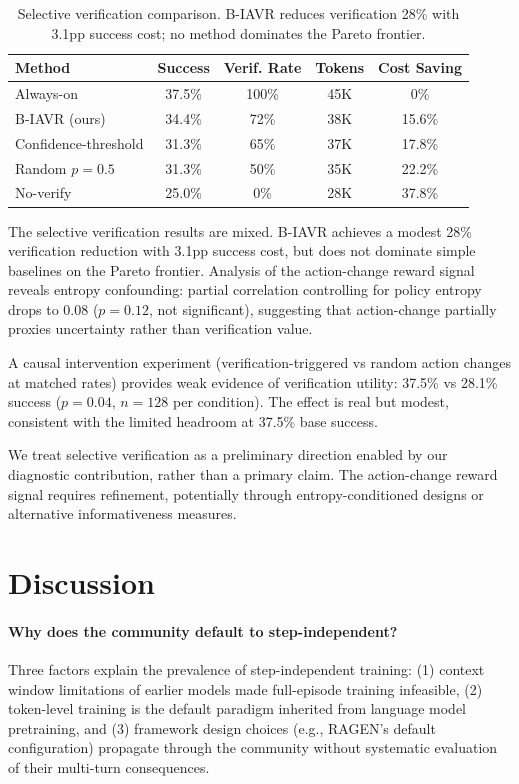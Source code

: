 \documentclass[11pt]{article}
\begin{document}
\begin{table}[h]
\centering
\caption{Selective verification comparison. B-IAVR reduces verification 28\% with 3.1pp success cost; no method dominates the Pareto frontier.}
\label{tab:selective}
\begin{tabular}{lcccc}
\toprule
Method & Success & Verif. Rate & Tokens & Cost Saving \\
\midrule
Always-on & 37.5\% & 100\% & 45K & 0\% \\
B-IAVR (ours) & 34.4\% & 72\% & 38K & 15.6\% \\
Confidence-threshold & 31.3\% & 65\% & 37K & 17.8\% \\
Random $p=0.5$ & 31.3\% & 50\% & 35K & 22.2\% \\
No-verify & 25.0\% & 0\% & 28K & 37.8\% \\
\bottomrule
\end{tabular}
\end{table}

The selective verification results are mixed. B-IAVR achieves a modest 28\% verification reduction with 3.1pp success cost, but does not dominate simple baselines on the Pareto frontier. Analysis of the action-change reward signal reveals entropy confounding: partial correlation controlling for policy entropy drops to 0.08 ($p=0.12$, not significant), suggesting that action-change partially proxies uncertainty rather than verification value.

A causal intervention experiment (verification-triggered vs random action changes at matched rates) provides weak evidence of verification utility: 37.5\% vs 28.1\% success ($p=0.04$, $n=128$ per condition). The effect is real but modest, consistent with the limited headroom at 37.5\% base success.

We treat selective verification as a preliminary direction enabled by our diagnostic contribution, rather than a primary claim. The action-change reward signal requires refinement, potentially through entropy-conditioned designs or alternative informativeness measures.

\section{Discussion}

\paragraph{Why does the community default to step-independent?}
Three factors explain the prevalence of step-independent training: (1) context window limitations of earlier models made full-episode training infeasible, (2) token-level training is the default paradigm inherited from language model pretraining, and (3) framework design choices (e.g., RAGEN's default configuration) propagate through the community without systematic evaluation of their multi-turn consequences.
\end{document}
